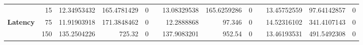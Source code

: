 \begin{table*}[]
{\begin{tabular}{lrrrrlrrrlrrr}
                     & 15                        & 12.34953432                                                                     & 165.4781429                                                                     & 0                                                                               &           & 13.08329538                                                                     & 165.6259286                                                                     & 0                                                                               &           & 13.45752559                                                                     & 97.64142857                                                                     & 0                                                                               \\
\textbf{Latency}     & 75                        & 11.91903918                                                                     & 171.3848462                                                                     & 0                                                                               &           & 12.2888868                                                                      & 97.346                                                                          & 0                                                                               &           & 14.52316102                                                                     & 341.4107143                                                                     & 0                                                                               \\
                     & 150                       & 135.2504226                                                                     & 725.32                                                                          & 0                                                                               &           & 137.9083201                                                                     & 952.54                                                                          & 0                                                                               &           & 13.46193531                                                                     & 491.5492308                                                                     & 0                                                                               \\

\end{tabular}}
\end{table*}
